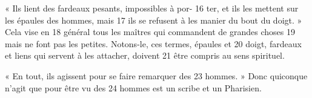 « Ils lient des fardeaux pesants, impossibles à por-	 
16	 	ter, et ils les mettent sur les épaules des hommes, mais	 
17	 	ils se refusent à les manier du bout du doigt. » Cela vise en	 
18	 	général tous les maîtres qui commandent de grandes choses	 
19	 	mais ne font pas les petites. Notons-le, ces termes, épaules et	 
20	 	doigt, fardeaux et liens qui servent à les attacher, doivent	 
21	 	être compris au sens spirituel.

« En tout, ils agissent pour se faire remarquer des	 
23	 	hommes. » Donc quiconque n'agit que pour être vu des	 
24	 	hommes est un scribe et un Pharisien.